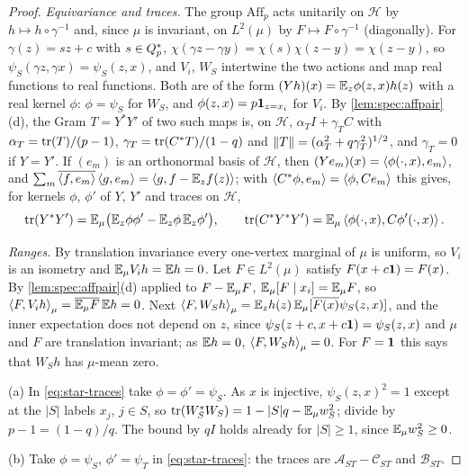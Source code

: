 \begin{proof}
\emph{Equivariance and traces.} The group $\mathrm{Aff}_p$ acts unitarily on
$\mathcal H$ by $h\mapsto h\circ\gamma^{-1}$ and, since $\mu$ is invariant, on $L^2(\mu)$
by $F\mapsto F\circ\gamma^{-1}$ (diagonally). For $\gamma(z)=sz+c$ with $s\in Q_{p}^{*}$,
$\chi(\gamma z-\gamma y)=\chi(s)\chi(z-y)=\chi(z-y)$, so $\psi_S(\gamma z,\gamma x)=\psi_S(z,x)$,
and $V_i$, $W_S$ intertwine the two actions and map real functions to real
functions. Both are of the form $(Yh)(x)=\mathbb E_z\phi(z,x)h(z)$ with a real kernel
$\phi$: $\phi=\psi_S$ for $W_S$, and $\phi(z,x)=p\mathbf 1_{z=x_i}$ for $V_i$. By
\cref{lem:spec:affpair}(d), the Gram $T=Y^*Y'$ of two such maps is, on $\mathcal H$,
$\alpha_TI+\gamma_TC$ with $\alpha_T=\operatorname{tr}(T)/(p-1)$, $\gamma_T=\operatorname{tr}(C^*T)/(1-q)$ and
$\left\|T\right\|=(\alpha_T^2+q\gamma_T^2)^{1/2}$, and $\gamma_T=0$ if $Y=Y'$. If $(e_m)$ is an
orthonormal basis of $\mathcal H$, then $(Ye_m)(x)=\left\langle \phi(\cdot,x),e_m\right\rangle$, and
$\sum_m\overline{\left\langle f,e_m\right\rangle}\left\langle g,e_m\right\rangle=\left\langle g,f-\mathbb E_zf(z)\right\rangle$; with $\left\langle C^*\phi,e_m\right\rangle=\left\langle \phi,Ce_m\right\rangle$
this gives, for kernels $\phi$, $\phi'$ of $Y$, $Y'$ and traces on $\mathcal H$,
\begin{equation}\label{eq:star-traces}
  \operatorname{tr}(Y^*Y')=\mathbb E_\mu\big(\mathbb E_z\phi\phi'-\mathbb E_z\phi\,\mathbb E_z\phi'\big),\qquad
  \operatorname{tr}(C^*Y^*Y')=\mathbb E_\mu\left\langle \phi(\cdot,x),C\phi'(\cdot,x)\right\rangle .
\end{equation}

\emph{Ranges.} By translation invariance every one-vertex marginal of $\mu$ is
uniform, so $V_i$ is an isometry and $\mathbb E_\mu V_ih=\mathbb E h=0$. Let $F\in L^2(\mu)$ satisfy
$F(x+c\mathbf 1)=F(x)$. By \cref{lem:spec:affpair}(d) applied to $F-\mathbb E_\mu F$,
$\mathbb E_\mu[F\mid x_i]=\mathbb E_\mu F$, so $\left\langle F,V_ih\right\rangle_\mu=\overline{\mathbb E_\mu F}\,\mathbb E h=0$. Next
$\left\langle F,W_Sh\right\rangle_\mu=\mathbb E_zh(z)\,\mathbb E_\mu[\overline{F(x)}\psi_S(z,x)]$, and the inner expectation does not
depend on $z$, since $\psi_S(z+c,x+c\mathbf 1)=\psi_S(z,x)$ and $\mu$ and $F$ are translation
invariant; as $\mathbb E h=0$, $\left\langle F,W_Sh\right\rangle_\mu=0$. For $F=\mathbf 1$ this says that $W_Sh$ has
$\mu$-mean zero.

(a) In \eqref{eq:star-traces} take $\phi=\phi'=\psi_S$. As $x$ is injective,
$\psi_S(z,x)^2=1$ except at the $|S|$ labels $x_j$, $j\in S$, so
$\operatorname{tr}(W_S^*W_S)=1-|S|q-\mathbb E_\mu w_S^2$; divide by $p-1=(1-q)/q$.
The bound by $qI$ holds already for $|S|\ge1$, since
$\mathbb E_\mu w_S^2\ge0$.

(b) Take $\phi=\psi_S$, $\phi'=\psi_T$ in \eqref{eq:star-traces}: the traces are
$\mathcal A_{ST}-\mathcal C_{ST}$ and $\mathcal B_{ST}$.


\end{proof}

